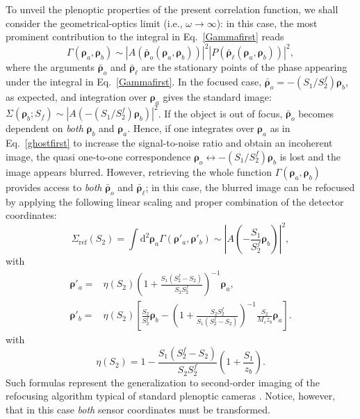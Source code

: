 \documentclass[aps,pra,amssymb,twocolumn,amsmath,superscriptaddress,showpacs,10pt]{revtex4-1}
\def\d{\mathrm{d}}
\begin{document}
To unveil the plenoptic properties of the present correlation function, we shall consider the geometrical-optics limit (i.e., $\omega\to\infty$): in this case, the most prominent contribution to the integral in Eq.~\eqref{Gammafirst} reads 
\begin{equation}\label{Gammastatfirst}
\Gamma(\bm{\rho}_a,\bm{\rho}_b) \sim \left|A(\bar{\bm{\rho}}_o(\bm{\rho}_a,\bm{\rho}_b))\right|^2 \left|P(\bar{\bm{\rho}}_{\ell}(\bm{\rho}_a,\bm{\rho}_b))\right|^2 ,
\end{equation}
where the arguments $\bar{\bm{\rho}}_o$ and $\bar{\bm{\rho}}_{\ell}$ are the stationary points of the phase appearing under the integral in Eq.\ \eqref{Gammafirst}. In the focused case, $\bar{\bm{\rho}}_o= -(S_1/S_2^f)\bm{\rho}_b$, as expected, and integration over $\bm{\rho}_a$ gives the standard image: $\Sigma(\bm{\rho}_b;S_f)\sim|A(-(S_1/S_2^f)\bm{\rho}_b)|^2$. If the object is out of focus, $\bar{\bm{\rho}}_o$ becomes dependent on \textit{both} $\bm{\rho}_b$ and $\bm{\rho}_a$. Hence, if one integrates over $\bm{\rho}_a$ as in Eq.\ \eqref{ghostfirst} to increase the signal-to-noise ratio and obtain an incoherent image, the quasi one-to-one correspondence $\bm{\rho}_o \leftrightarrow -(S_1/S_2^f)\bm{\rho}_b$ is lost and the image appears blurred. However, retrieving the whole function $\Gamma(\bm{\rho}_a,\bm{\rho}_b)$ provides access to \textit{both} $\bar{\bm{\rho}}_o$ and $\bar{\bm{\rho}}_{\ell}$; in this case, the blurred image can be refocused by applying the following linear scaling and  proper combination of the detector coordinates:
\begin{equation}
\Sigma_{\mathrm{ref}} (S_2) = \int\d^2\bm{\rho}_a \Gamma(\bm{\rho}'_a,\bm{\rho}'_b) \sim \left| A\left( - \frac{S_1}{S_2^f} \bm{\rho}_b \right) \right|^2 ,
\end{equation}
with
\begin{align}
\bm{\rho}'_a = & \eta(S_2) \left( 1 + \frac{S_1(S_2^f-S_2)}{S_2 S_2^f} \right)^{-1} \bm{\rho}_a , \\
\bm{\rho}'_b = & \eta(S_2) \left[ \frac{S_2}{S_2^f} \bm{\rho}_b - \left( 1+ \frac{S_2 S_2^f}{S_1(S_2^f-S_2)} \right)^{-1} \!\frac{S_2}{M_s z_b} \bm{\rho}_a \right] .
\end{align}
with
\begin{equation}
\eta(S_2)= 1- \frac{S_1(S_2^f-S_2)}{S_2 S_2^f} \left( 1+ \frac{S_1}{z_b} \right) .
\end{equation} 
Such formulas represent the generalization to second-order imaging of the refocusing algorithm typical of standard plenoptic cameras \cite{ng}. Notice, however, that in this case \textit{both} sensor coordinates must be transformed.
\end{document}
